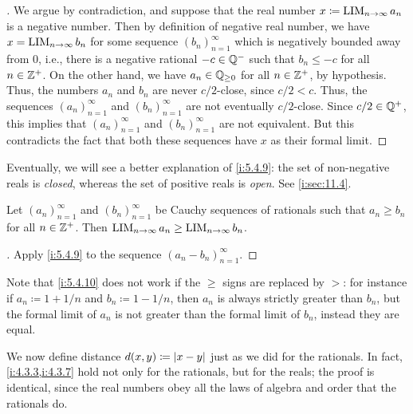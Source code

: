 \begin{proof}[]
  We argue by contradiction, and suppose that the real number \(x \coloneqq \operatorname*{LIM}_{n \to \infty} a_n\) is a negative number.
  Then by definition of negative real number, we have \(x = \operatorname*{LIM}_{n \to \infty} b_n\) for some sequence \((b_n)_{n = 1}^\infty\) which is negatively bounded away from \(0\), i.e., there is a negative rational \(-c \in \mathbb{Q}^-\) such that \(b_n \leq -c\) for all \(n \in \mathbb{Z}^+\).
  On the other hand, we have \(a_n \in \mathbb{Q}_{\geq 0}\) for all \(n \in \mathbb{Z}^+\), by hypothesis.
  Thus, the numbers \(a_n\) and \(b_n\) are never \(c / 2\)-close, since \(c / 2 < c\).
  Thus, the sequences \((a_n)_{n = 1}^{\infty}\) and \((b_n)_{n = 1}^{\infty}\) are not eventually \(c / 2\)-close.
  Since \(c / 2 \in \mathbb{Q}^+\), this implies that \((a_n)_{n = 1}^{\infty}\) and \((b_n)_{n = 1}^{\infty}\) are not equivalent.
  But this contradicts the fact that both these sequences have \(x\) as their formal limit.
\end{proof}

\begin{note}
  Eventually, we will see a better explanation of \cref{i:5.4.9}:
  the set of non-negative reals is \emph{closed}, whereas the set of positive reals is \emph{open}.
  See \cref{i:sec:11.4}.
\end{note}

\begin{cor}\label{i:5.4.10}
  Let \((a_n)_{n = 1}^{\infty}\) and \((b_n)_{n = 1}^{\infty}\) be Cauchy sequences of rationals such that \(a_n \geq b_n\) for all \(n \in \mathbb{Z}^+\).
  Then \(\operatorname*{LIM}_{n \to \infty} a_n \geq \operatorname*{LIM}_{n \to \infty} b_n\).
\end{cor}

\begin{proof}[]
  Apply \cref{i:5.4.9} to the sequence \((a_n - b_n)_{n = 1}^\infty\).
\end{proof}

\begin{rmk}\label{i:5.4.11}
  Note that \cref{i:5.4.10} does not work if the \(\geq\) signs are replaced by \(>\):
  for instance if \(a_n \coloneqq 1 + 1 / n\) and \(b_n \coloneqq 1 - 1 / n\), then \(a_n\) is always strictly greater than \(b_n\), but the formal limit of \(a_n\) is not greater than the formal limit of \(b_n\), instead they are equal.
\end{rmk}

\begin{ac}\label{i:ac:5.4.1}
  We now define distance \(d(x, y) \coloneqq \left\lvert x - y\right\rvert\) just as we did for the rationals.
  In fact, \cref{i:4.3.3,i:4.3.7} hold not only for the rationals, but for the reals;
  the proof is identical, since the real numbers obey all the laws of algebra and order that the rationals do.
\end{ac}

